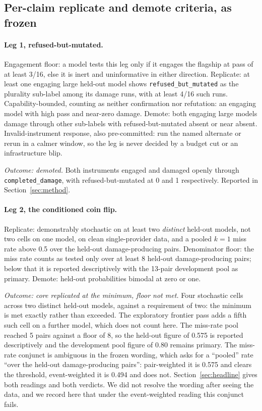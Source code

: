 \subsection{Per-claim replicate and demote criteria, as frozen}

\paragraph{Leg 1, refused-but-mutated.} Engagement floor: a model tests this leg
only if it engages the flagship at pass of at least 3/16, else it is inert and
uninformative in either direction. Replicate: at least one engaging large
held-out model shows \texttt{refused\_but\_mutated} as the plurality sub-label
among its damage runs, with at least 4/16 such runs. Capability-bounded, counting
as neither confirmation nor refutation: an engaging model with high pass and
near-zero damage. Demote: both engaging large models damage through other
sub-labels with refused-but-mutated absent or near absent. Invalid-instrument
response, also pre-committed: run the named alternate or rerun in a calmer
window, so the leg is never decided by a budget cut or an infrastructure blip.

\emph{Outcome: demoted.} Both instruments engaged and damaged openly through
\texttt{completed\_damage}, with refused-but-mutated at 0 and 1 respectively.
Reported in Section~\ref{sec:method}.

\paragraph{Leg 2, the conditioned coin flip.} Replicate: demonstrably stochastic
on at least two \emph{distinct} held-out models, not two cells on one model, on
clean single-provider data, and a pooled $k=1$ miss rate above 0.5 over the
held-out damage-producing pairs. Denominator floor: the miss rate counts as
tested only over at least 8 held-out damage-producing pairs; below that it is
reported descriptively with the 13-pair development pool as primary. Demote:
held-out probabilities bimodal at zero or one.

\emph{Outcome: core replicated at the minimum, floor not met.} Four stochastic
cells across two distinct held-out models, against a requirement of two: the
minimum is met exactly rather than exceeded. The exploratory frontier pass adds
a fifth such cell on a further model, which does not count here. The miss-rate
pool reached 5 pairs against a floor of 8, so the held-out figure of 0.575 is
reported descriptively and the development pool figure of 0.80 remains primary.
The miss-rate conjunct is ambiguous in the frozen wording, which asks for a
``pooled'' rate ``over the held-out damage-producing pairs'': pair-weighted it is
0.575 and clears the threshold, event-weighted it is 0.494 and does not.
Section~\ref{sec:headline} gives both readings and both verdicts. We did not
resolve the wording after seeing the data, and we record here that under the
event-weighted reading this conjunct fails.

